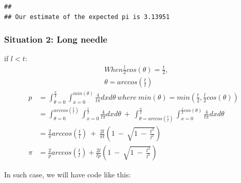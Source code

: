 \documentclass[]{article}
\begin{document}
\begin{verbatim}
## 
## Our estimate of the expected pi is 3.13951
\end{verbatim}

\subsubsection{Situation 2: Long needle}\label{situation-2-long-needle}

if \(l < t\): \[ \begin{split}
&When \frac l2cos(\theta) = \frac t2, \\
&\theta = arccos(\frac tl)
\end{split}\] \[ \begin{split}
p &= \int_{\theta = 0}^\frac{\pi}{2} \int_{x = 0}^{min(\theta)} \frac{4}{t \pi} dx d\theta\ where\ min(\theta) = min(\frac t2, \frac{l}{2}cos(\theta))\\
&= \int_{\theta = 0}^{arccos(\frac tl)} \int_{x = 0}^{\frac t2} \frac{4}{t \pi} dx d\theta\ +\ \int_{\theta = arccos(\frac tl)}^{\frac{\pi}{2}} \int_{x=0}^{\frac l2 cos(\theta)} \frac{4}{t \pi} dxd \theta \\
&= \frac{2}{\pi} arccos(\frac tl)\ +\ \frac{2l}{\pi t}(1\ -\ \sqrt{1\ -\ \frac{t^2}{l^2}}) \\
\pi &= \frac 2p arccos(\frac tl) + \frac {2l}{tp} (1\ -\ \sqrt{1\ -\ \frac{t^2}{l^2}})
\end{split}\]

In such case, we will have code like this:
\end{document}
